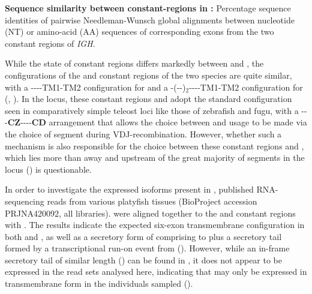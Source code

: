 \begin{table}
	\centering
	\caption[Sequence similarity between  constant-regions in \Xma]{\textbf{Sequence similarity between  constant-regions in \Xma:} Percentage sequence identities of pairwise Needleman-Wunsch global alignments between nucleotide (NT) or amino-acid (AA) sequences of corresponding \cz{} exons from the two  constant regions of \Xma \textit{IGH}.}
	
	\label{tab:xma-cz-aln}
\end{table}

While the state of  constant regions differs markedly between \Xma and \Nfu, the configurations of the  and  constant regions of the two species are quite similar, with a {----TM1-TM2} configuration for  and a {-(--)$_2$----TM1-TM2} configuration for  (, ). In the \Xma locus, these constant regions and  adopt the standard configuration seen in comparatively simple teleost \igh{} loci like those of zebrafish and fugu, with a {\vh-\dh-\jh-\textbf{CZ}-\dh-\jh--\textbf{CD}} arrangement that allows the choice between  and  usage to be made via the choice of \dh segment during VDJ-recombination. However, whether such a mechanism is also responsible for the choice between these constant regions and , which lies more than  away and upstream of the great majority of \vh segments in the locus () is questionable.

In order to investigate the expressed isoforms present in \Xma, published RNA-sequencing reads from various platyfish tissues (BioProject accession PRJNA420092, all libraries). were aligned together to the  and  constant regions with . The results indicate the expected six-exon transmembrane configuration in both  and , as well as a secretory form of  comprising  to  plus a  secretory tail formed by a transcriptional run-on event from  (). However, while an in-frame secretory tail of similar length () can be found in , it does not appear to be expressed in the read sets analysed here, indicating that  may only be expressed in transmembrane form in the individuals sampled ().

